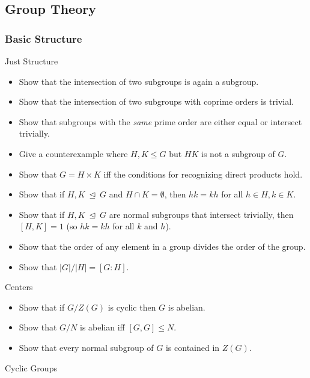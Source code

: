 \hypertarget{group-theory-2}{%
\subsection{Group Theory}\label{group-theory-2}}

\hypertarget{basic-structure}{%
\subsubsection{Basic Structure}\label{basic-structure}}

Just Structure

\begin{itemize}
\tightlist
\item
  Show that the intersection of two subgroups is again a subgroup.
\item
  Show that the intersection of two subgroups with coprime orders is
  trivial.
\item
  Show that subgroups with the \emph{same} prime order are either equal
  or intersect trivially.
\item
  Give a counterexample where \(H,K\leq G\) but \(HK\) is not a subgroup
  of \(G\).
\item
  Show that \(G=H\times K\) iff the conditions for recognizing direct
  products hold.
\item
  Show that if \(H, K {~\trianglelefteq~}G\) and
  \(H\cap K = \emptyset\), then \(hk=kh\) for all \(h\in H,k\in K\).
\item
  Show that if \(H,K{~\trianglelefteq~}G\) are normal subgroups that
  intersect trivially, then \([H, K] = 1\) (so \(hk = kh\) for all \(k\)
  and \(h\)).
\item
  Show that the order of any element in a group divides the order of the
  group.
\item
  Show that
  \({\left\lvert {G} \right\rvert}/{\left\lvert {H} \right\rvert} = [G: H]\).
\end{itemize}

Centers

\begin{itemize}
\tightlist
\item
  Show that if \(G/Z(G)\) is cyclic then \(G\) is abelian.
\item
  Show that \(G/N\) is abelian iff \([G, G] \leq N\).
\item
  Show that every normal subgroup of \(G\) is contained in \(Z(G)\).
\end{itemize}

Cyclic Groups

